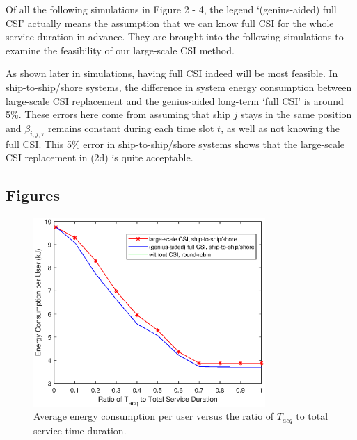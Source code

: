 \documentclass[conference]{IEEEtran}
\begin{document}
Of all the following simulations in Figure 2 - 4, %
the legend `(genius-aided) full CSI' actually means the assumption that we can know full CSI for the whole service duration in advance. %
They are brought into the following simulations to examine the feasibility of our large-scale CSI method. 
 
 
 As shown later in simulations, having full CSI indeed will be most feasible. In ship-to-ship/shore systems, the difference in system energy consumption between large-scale CSI replacement and the genius-aided long-term `full CSI' is around 5\%. These errors here come from assuming that ship $j$ stays in the same position and $\beta _{i,j,\tau }$ remains constant during each time slot $t$, as well as not knowing the full CSI.
 This 5\% error in ship-to-ship/shore systems shows that the large-scale CSI replacement in (2d) is quite acceptable. %
  
 
 \subsection{Figures}
 
 \begin{figure} [htb]
 \begin{center}
 \includegraphics*[width=8.8cm]{Tranges.eps}
 \end{center}
 \vspace*{-4mm} 
 \caption{Average energy consumption per user versus the ratio of ${T_{acq}}$ to total service time duration.} \label{fig:2}
 \vspace*{-2mm} 
 \end{figure}
 
\end{document}
